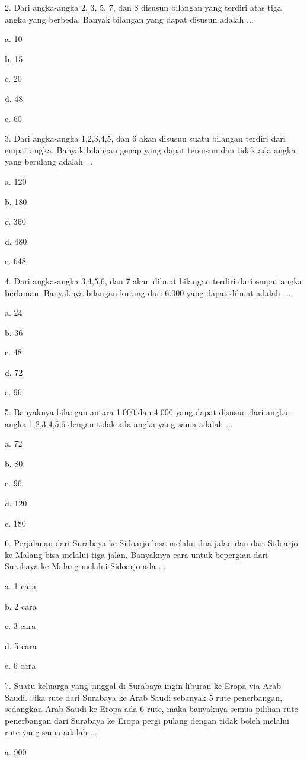 \documentclass[11pt,fleqn]{book} %
\begin{document}
2. Dari angka-angka 2, 3, 5, 7, dan 8 disusun bilangan yang terdiri atas tiga angka yang berbeda. Banyak bilangan yang dapat disusun adalah ... 

a.	10

b.	15

c.	20

d.	48

e.	60


3. Dari angka-angka 1,2,3,4,5, dan 6 akan disusun suatu bilangan terdiri dari empat angka. Banyak bilangan genap yang dapat tersusun dan tidak ada angka yang berulang adalah ... 

a.	120

b.	180

c.	360

d.	480

e.	648 


4. Dari angka-angka 3,4,5,6, dan 7 akan dibuat bilangan terdiri dari empat angka berlainan. Banyaknya bilangan kurang dari 6.000 yang dapat dibuat adalah …. 

a.	24

b.	36

c.	48

d.	72

e.	96


5. Banyaknya bilangan antara 1.000 dan 4.000 yang dapat disusun dari angka-angka 1,2,3,4,5,6 dengan tidak ada angka yang sama adalah ... 

a.	72

b.	80

c.	96

d.	120

e.	180


6. Perjalanan dari Surabaya ke Sidoarjo bisa melalui dua jalan dan dari Sidoarjo ke Malang bisa melalui tiga jalan. Banyaknya cara untuk bepergian dari Surabaya ke Malang melalui Sidoarjo ada ... 

a.	1 cara

b.	2 cara

c.	3 cara

d.	5 cara

e.	6 cara


7. Suatu keluarga yang tinggal di Surabaya ingin liburan ke Eropa via Arab Saudi. Jika rute dari Surabaya ke Arab Saudi sebanyak 5 rute penerbangan, sedangkan Arab Saudi ke Eropa ada 6 rute, maka banyaknya semua pilihan rute penerbangan dari Surabaya ke Eropa pergi pulang dengan tidak boleh melalui rute yang sama adalah ... 

a.	900
\end{document}
